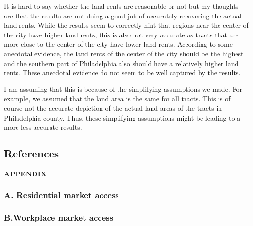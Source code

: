 \documentclass[
  11pt]{article}
\begin{document}
\normalsize

It is hard to say whether the land rents are reasonable or not but my
thoughts are that the results are not doing a good job of accurately
recovering the actual land rents. While the results seem to correctly
hint that regions near the center of the city have higher land rents,
this is also not very accurate as tracts that are more close to the
center of the city have lower land rents. According to some anecdotal
evidence, the land rents of the center of the city should be the highest
and the southern part of Philadelphia also should have a relatively
higher land rents. These anecdotal evidence do not seem to be well
captured by the results.

I am assuming that this is because of the simplifying assumptions we
made. For example, we assumed that the land area is the same for all
tracts. This is of course not the accurate depiction of the actual land
areas of the tracts in Philadelphia county. Thus, these simplifying
assumptions might be leading to a more less accurate results.

\clearpage

\subsection*{References}\label{references}

\renewcommand{\bibsection}{}


\clearpage

\label{appendix}
\bigskip

\begin{center}

{\large\bf APPENDIX}

\end{center}

\subsubsection*{A. Residential market
access}\label{a.-residential-market-access}



\clearpage

\subsubsection*{B.Workplace market
access}\label{b.workplace-market-access}


\end{document}
